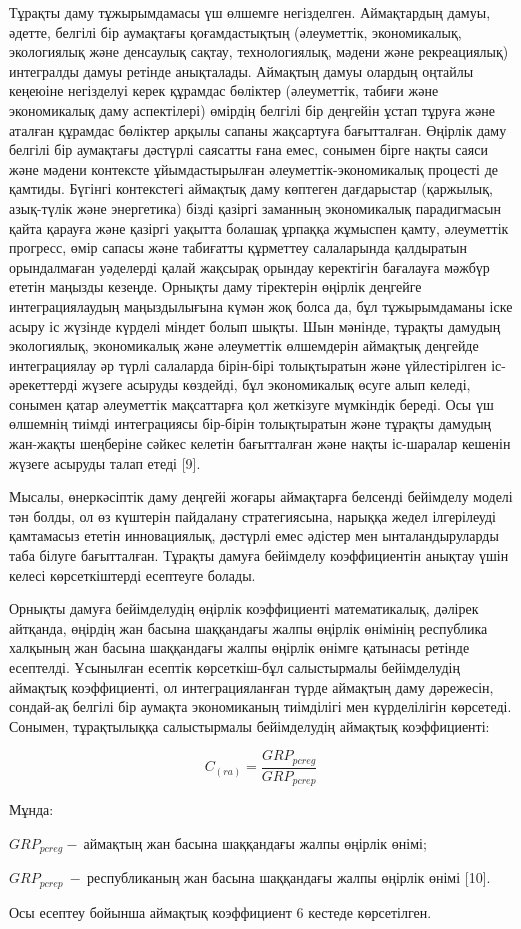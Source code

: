 \begin{multicols}{2}
Тұрақты даму тұжырымдамасы үш өлшемге негізделген. Аймақтардың дамуы,
әдетте, белгілі бір аумақтағы қоғамдастықтың (әлеуметтік, экономикалық,
экологиялық және денсаулық сақтау, технологиялық, мәдени және
рекреациялық) интегралды дамуы ретінде анықталады. Аймақтың дамуы
олардың оңтайлы кеңеюіне негізделуі керек құрамдас бөліктер (әлеуметтік,
табиғи және экономикалық даму аспектілері) өмірдің белгілі бір деңгейін
ұстап тұруға және аталған құрамдас бөліктер арқылы сапаны жақсартуға
бағытталған. Өңірлік даму белгілі бір аумақтағы дәстүрлі саясатты ғана
емес, сонымен бірге нақты саяси және мәдени контексте ұйымдастырылған
әлеуметтік-экономикалық процесті де қамтиды. Бүгінгі контекстегі
аймақтық даму көптеген дағдарыстар (қаржылық, азық-түлік және
энергетика) бізді қазіргі заманның экономикалық парадигмасын қайта
қарауға және қазіргі уақытта болашақ ұрпаққа жұмыспен қамту, әлеуметтік
прогресс, өмір сапасы және табиғатты құрметтеу салаларында қалдыратын
орындалмаған уәделерді қалай жақсырақ орындау керектігін бағалауға
мәжбүр ететін маңызды кезеңде. Орнықты даму тіректерін өңірлік деңгейге
интеграциялаудың маңыздылығына күмән жоқ болса да, бұл тұжырымдаманы
іске асыру іс жүзінде күрделі міндет болып шықты. Шын мәнінде, тұрақты
дамудың экологиялық, экономикалық және әлеуметтік өлшемдерін аймақтық
деңгейде интеграциялау әр түрлі салаларда бірін-бірі толықтыратын және
үйлестірілген іс-әрекеттерді жүзеге асыруды көздейді, бұл экономикалық
өсуге алып келеді, сонымен қатар әлеуметтік мақсаттарға қол жеткізуге
мүмкіндік береді. Осы үш өлшемнің тиімді интеграциясы бір-бірін
толықтыратын және тұрақты дамудың жан-жақты шеңберіне сәйкес келетін
бағытталған және нақты іс-шаралар кешенін жүзеге асыруды талап етеді
{[}9{]}.

Мысалы, өнеркәсіптік даму деңгейі жоғары аймақтарға белсенді бейімделу
моделі тән болды, ол өз күштерін пайдалану стратегиясына, нарыққа жедел
ілгерілеуді қамтамасыз ететін инновациялық, дәстүрлі емес әдістер мен
ынталандыруларды таба білуге бағытталған. Тұрақты дамуға бейімделу
коэффициентін анықтау үшін келесі көрсеткіштерді есептеуге болады.

Орнықты дамуға бейімделудің өңірлік коэффициенті математикалық, дәлірек
айтқанда, өңірдің жан басына шаққандағы жалпы өңірлік өнімінің
республика халқының жан басына шаққандағы жалпы өңірлік өнімге қатынасы
ретінде есептелді. Ұсынылған есептік көрсеткіш-бұл салыстырмалы
бейімделудің аймақтық коэффициенті, ол интеграцияланған түрде аймақтың
даму дәрежесін, сондай-ақ белгілі бір аумақта экономиканың тиімділігі
мен күрделілігін көрсетеді. Сонымен, тұрақтылыққа салыстырмалы
бейімделудің аймақтық коэффициенті:

\[C_{(ra)} = \frac{{GRP}_{pcreg}}{{GRP}_{pcrep}}\]

Мұнда:

\({GRP}_{pcreg} - \ аймақтың\) жан басына шаққандағы жалпы өңірлік
өнімі;

\({GRP}_{pcrep}\  - \ \)республиканың жан басына шаққандағы жалпы
өңірлік өнімі {[}10{]}.

Осы есептеу бойынша аймақтық коэффициент 6 кестеде көрсетілген.
\end{multicols}

